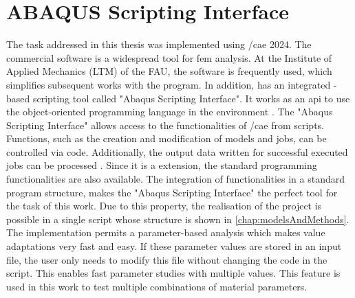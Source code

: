 \section{ABAQUS Scripting Interface} \label{sec: AbaqusBasics}

The task addressed in this thesis was implemented using /\acrshort{cae} 2024. The commercial software is a widespread tool for \acrshort{fem} analysis. At the Institute of Applied Mechanics (LTM) of the FAU, the software is frequently used, which simplifies subsequent works with the program. In addition,  has an integrated -based scripting tool called "Abaqus Scripting Interface". It works as an \acrfull{api} to use the object-oriented programming language  in the  environment \cite{dassault_systems_abaqus_2015-1}. The "Abaqus Scripting Interface" allows access to the functionalities of /\acrshort{cae} from scripts. Functions, such as the creation and modification of models and jobs, can be controlled via code. Additionally, the output data written for successful executed jobs can be processed \cite{dassault_systems_abaqus_2015-1}. Since it is a  extension, the standard programming functionalities are also available. The integration of  functionalities in a standard program structure, makes the "Abaqus Scripting Interface" the perfect tool for the task of this work. Due to this property, the realisation of the project is possible in a single script whose structure is shown in \autoref{chap:modelsAndMethods}. The implementation permits a parameter-based analysis which makes value adaptations very fast and easy. If these parameter values are stored in an input file, the user only needs to modify this file without changing the code in the script. This enables fast parameter studies with multiple values. This feature is used in this work to test multiple combinations of material parameters.  





